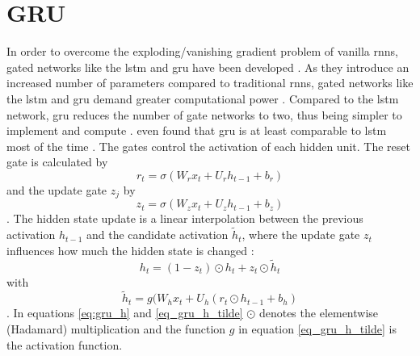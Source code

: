 \documentclass[12pt, a4paper, headinclude, twoside, plainheadsepline, open=right, numbers=noenddot, hidelinks, toc=listof, toc=bibliography]{scrreprt}
\begin{document}
\section{GRU}
\label{sec:gru}
In order to overcome the exploding/vanishing gradient problem of vanilla \acp{rnn}, gated networks like the \ac{lstm} \cite{hochreiterLongShortTermMemory1997} and \ac{gru} \cite{choLearningPhraseRepresentations2014} have been developed \cite{vanhoudtReviewLongShortterm2020}.
As they introduce an increased number of parameters compared to traditional \acp{rnn}, gated networks like the \ac{lstm} and \ac{gru} demand greater computational power \cite{deyGatevariantsGatedRecurrent2017}.
Compared to the \ac{lstm} network, \ac{gru} reduces the number of gate networks to two, thus being simpler to implement and compute \cite{choLearningPhraseRepresentations2014}.
 even found that \ac{gru} is at least comparable to \ac{lstm} most of the time \cite{chungEmpiricalEvaluationGated2014}.
The gates control the activation of each hidden unit.
The reset gate is calculated by
\begin{equation}
\label{eq:gru_reset}
r_t = \sigma (W_r x_t + U_r h_{t-1} + b_r)
\end{equation}
and the update gate $z_j$ by
\begin{equation}
\label{eq:gru_update}
z_t = \sigma (W_z x_t + U_z h_{t-1} + b_z)
\end{equation}
\cite{deyGatevariantsGatedRecurrent2017}.
The hidden state update is a linear interpolation between the previous activation $h_{t-1}$ and the candidate activation $\tilde{h}_t$, where the update gate $z_t$ influences how much the hidden state is changed \cite{chungEmpiricalEvaluationGated2014}:
\begin{equation}
\label{eq:gru_h}
h_t = (1-z_t) \odot h_t + z_t \odot \tilde{h}_t
\end{equation}
with
\begin{equation}
\label{eq_gru_h_tilde}
\tilde{h}_t = g(W_h x_t + U_h (r_t \odot h_{t-1} + b_h)
\end{equation}
.
In equations \ref{eq:gru_h} and \ref{eq_gru_h_tilde} $\odot$ denotes the elementwise (Hadamard) multiplication and the function $g$ in equation \ref{eq_gru_h_tilde} is the activation function.
\end{document}
